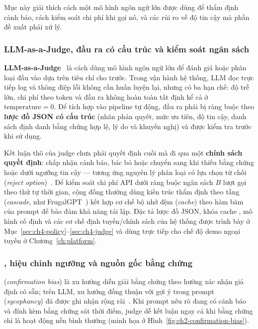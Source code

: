 Mục này giải thích cách một mô hình ngôn ngữ lớn được dùng để thẩm định cảnh báo, cách kiểm soát chi phí khi gọi nó, và các rủi ro về độ tin cậy mà phần đề xuất phải xử lý.

\subsubsection{LLM-as-a-Judge, đầu ra có cấu trúc và kiểm soát ngân sách}
\label{sec:ch2-prompt}
\label{sec:ch2-ngan-sach}

\textbf{LLM-as-a-Judge}~\cite{zheng2023judging} là cách dùng mô hình ngôn ngữ lớn để đánh giá hoặc phân loại đầu vào dựa trên tiêu chí cho trước. Trong vận hành hệ thống, LLM đọc trực tiếp log và thông điệp lỗi không cần huấn luyện lại, nhưng có ba hạn chế: độ trễ lớn, chi phí theo token và đầu ra không hoàn toàn tất định kể cả ở $\text{temperature} = 0$. Để tích hợp vào pipeline tự động, đầu ra phải bị ràng buộc theo \textbf{lược đồ JSON có cấu trúc} (nhãn phán quyết, mức ưu tiên, độ tin cậy, danh sách định danh bằng chứng hợp lệ, lý do và khuyến nghị) và được kiểm tra trước khi sử dụng.

Kết luận thô của judge chưa phải quyết định cuối mà đi qua một \textbf{chính sách quyết định}: chấp nhận cảnh báo, bác bỏ hoặc chuyển sang  khi thiếu bằng chứng hoặc dưới ngưỡng tin cậy — tương ứng nguyên lý phân loại có lựa chọn từ chối (\emph{reject option})~\cite{chow1970reject}. Để kiểm soát chi phí API dưới ràng buộc ngân sách $B$ lượt gọi theo thứ tự thời gian, cộng đồng thường dùng kiến trúc thẩm định theo tầng (\emph{cascade}, như FrugalGPT~\cite{chen2024frugalgpt}) kết hợp cơ chế bộ nhớ đệm (\emph{cache}) theo hàm băm của prompt để bảo đảm khả năng tái lập. Đặc tả lược đồ JSON, khóa cache , mô hình cố định  và các cơ chế định tuyến/chính sách của hệ thống được trình bày ở Mục~\ref{sec:ch4-policy}--\ref{sec:ch4-judge} và dùng trực tiếp cho chế độ demo ngoại tuyến ở Chương~\ref{ch:platform}.

\subsubsection{, hiệu chỉnh ngưỡng và nguồn gốc bằng chứng}
\label{sec:ch2-thien-lech}

\textbf{} (\emph{confirmation bias}) là xu hướng diễn giải bằng chứng theo hướng xác nhận giả định có sẵn; trên LLM, xu hướng đồng thuận với gợi ý trong prompt (\emph{sycophancy}) đã được ghi nhận rộng rãi~\cite{sharma2024sycophancy}. Khi prompt nêu rõ đang có cảnh báo và đính kèm bằng chứng sát thời điểm, judge dễ kết luận  ngay cả khi bằng chứng chỉ là hoạt động nền bình thường (minh họa ở Hình~\ref{fig:ch2-confirmation-bias}).


